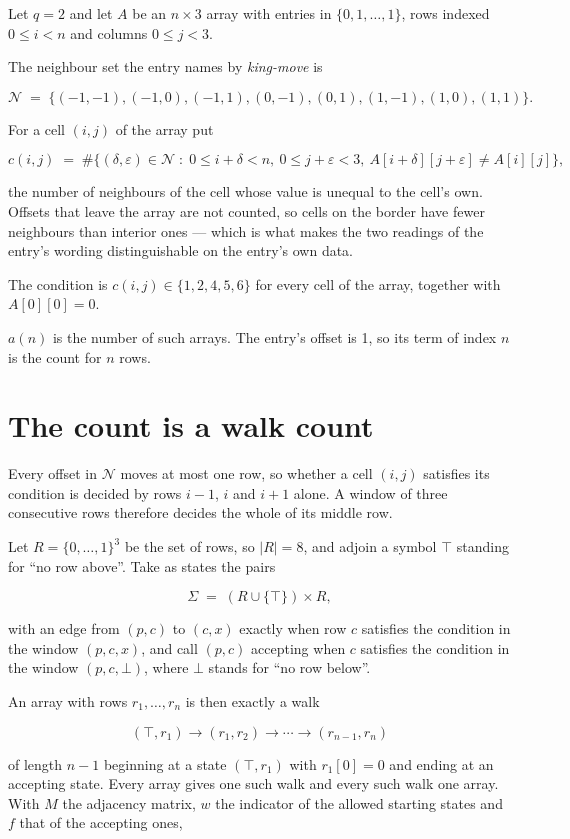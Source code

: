 \documentclass[11pt]{article}
\theoremstyle{definition}
\begin{document}
Let $q = 2$ and let $A$ be an $n \times 3$ array with entries in $\{0,1,\dots,1\}$, rows indexed $0 \le i < n$ and columns $0 \le j < 3$.

The neighbour set the entry names by {\itshape king-move} is

\[\mathcal{N} \;=\; \{(-1,-1), (-1,0), (-1,1), (0,-1), (0,1), (1,-1), (1,0), (1,1)\}.\]

For a cell $(i,j)$ of the array put

\[c(i,j) \;=\; \#\bigl\{(\delta,\varepsilon)\in\mathcal{N} \;:\; 0\le i+\delta<n,\ 0\le j+\varepsilon<3,\ A[i+\delta][j+\varepsilon] \neq A[i][j]\bigr\},\]

the number of neighbours of the cell whose value is unequal to the cell's own. Offsets that leave the array are not counted, so cells on the border have fewer neighbours than interior ones --- which is what makes the two readings of the entry's wording distinguishable on the entry's own data.

The condition is $c(i,j) \in \{1, 2, 4, 5, 6\}$ for every cell of the array, together with $A[0][0]=0$.

$a(n)$ is the number of such arrays. The entry's offset is 1, so its term of index $n$ is the count for $n$ rows.

\section{The count is a walk count}

Every offset in $\mathcal{N}$ moves at most one row, so whether a cell $(i,j)$ satisfies its condition is decided by rows $i-1$, $i$ and $i+1$ alone. A window of three consecutive rows therefore decides the whole of its middle row.

Let $R = \{0,\dots,1\}^{3}$ be the set of rows, so $|R| = 8$, and adjoin a symbol $\top$ standing for ``no row above''. Take as states the pairs

\[\Sigma \;=\; (R \cup \{\top\}) \times R,\]

with an edge from $(p,c)$ to $(c,x)$ exactly when row $c$ satisfies the condition in the window $(p,c,x)$, and call $(p,c)$ accepting when $c$ satisfies the condition in the window $(p,c,\bot)$, where $\bot$ stands for ``no row below''.

An array with rows $r_1,\dots,r_n$ is then exactly a walk

\[(\top,r_1) \to (r_1,r_2) \to \cdots \to (r_{n-1},r_n)\]

of length $n-1$ beginning at a state $(\top,r_1)$ with $r_1[0]=0$ and ending at an accepting state. Every array gives one such walk and every such walk one array. With $M$ the adjacency matrix, $w$ the indicator of the allowed starting states and $f$ that of the accepting ones,
\end{document}
